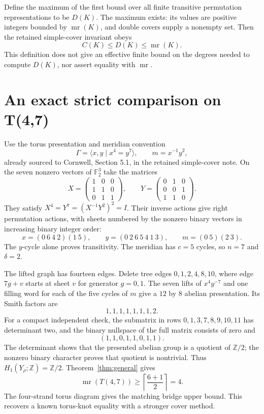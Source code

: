 \documentclass[11pt]{article}
\newcommand{\mr}{\operatorname{mr}}
\newcommand{\F}{\mathbb F}
\begin{document}
Define the maximum of the first bound over all finite transitive
permutation representations to be $D(K)$. The maximum exists: its
values are positive integers bounded by $\mr(K)$, and double covers
supply a nonempty set. Then the retained simple-cover invariant obeys
\[
                         C(K)\le D(K)\le\mr(K).
\]
This definition does not give an effective finite bound on the degrees
needed to compute $D(K)$, nor assert equality with $\mr$.

\section{An exact strict comparison on T(4,7)}

Use the torus presentation and meridian convention
\[
 \Gamma=\langle x,y\mid x^4=y^7\rangle,\qquad m=x^{-1}y^2,
\]
already sourced to Cornwell, Section 5.1, in the retained simple-cover
note. On the seven nonzero vectors of $\F_2^3$ take the matrices
\[
 X=\begin{pmatrix}1&0&0\\1&1&0\\0&1&1\end{pmatrix},\qquad
 Y=\begin{pmatrix}0&1&0\\0&0&1\\1&1&0\end{pmatrix}.
\]
They satisfy $X^4=Y^7=(X^{-1}Y^2)^2=I$. Their inverse actions give
right permutation actions, with sheets numbered by the nonzero binary
vectors in increasing binary integer order:
\[
 x=(0\ 6\ 4\ 2)(1\ 5),\qquad
 y=(0\ 2\ 6\ 5\ 4\ 1\ 3),\qquad
 m=(0\ 5)(2\ 3).
\]
The $y$-cycle alone proves transitivity. The meridian has $c=5$ cycles,
so $n=7$ and $\delta=2$.

The lifted graph has fourteen edges. Delete tree edges
$0,1,2,4,8,10$, where edge $7g+v$ starts at sheet $v$ for generator
$g=0,1$. The seven lifts of $x^4y^{-7}$ and one filling word for each
of the five cycles of $m$ give a $12$ by $8$ abelian presentation.
Its Smith factors are
\[
                              1,1,1,1,1,1,1,2.
\]
For a compact independent check, the submatrix in rows
$0,1,3,7,8,9,10,11$ has determinant two, and the binary nullspace of
the full matrix consists of zero and
\[
                             (1,1,0,1,1,0,1,1).
\]
The determinant shows that the presented abelian group is a quotient
of $\mathbb Z/2$; the nonzero binary character proves that quotient
is nontrivial. Thus $H_1(Y_\rho;\mathbb Z)=\mathbb Z/2$.
Theorem~\ref{thm:general} gives
\[
 \mr(T(4,7))\ge\left\lceil\frac{6+1}{2}\right\rceil=4.
\]
The four-strand torus diagram gives the matching bridge upper bound.
This recovers a known torus-knot equality with a stronger cover method.
\end{document}
